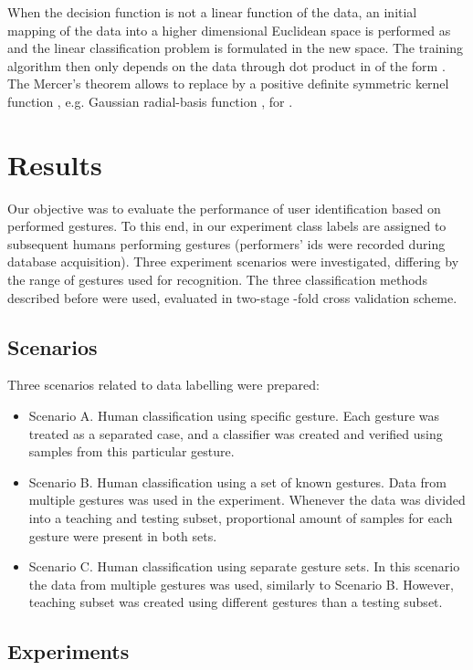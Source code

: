 \documentclass[]{article}
\begin{document}
When the decision function is not a linear function of the data, an initial
mapping  of the data into a higher dimensional Euclidean space  is
performed as  and the linear classification problem
is formulated in the new space. The training algorithm then only depends on the
data through dot product in  of the form .  The Mercer's theorem \cite{Burges:1998} allows to
replace  by a positive definite
symmetric kernel function , e.g. Gaussian
radial-basis function , for .

\section{Results}
Our objective was to evaluate the performance of user identification based on
performed gestures. To this end, in our experiment class labels are assigned to
subsequent humans performing gestures (performers' ids were recorded during
database acquisition). Three experiment scenarios were investigated, differing
by the range of gestures used for recognition. The three  classification methods
described before were used, evaluated in two-stage -fold cross validation
scheme.

\subsection{Scenarios}
Three scenarios related to data labelling were prepared:
\begin{itemize}
\item Scenario A. Human classification using specific gesture. Each gesture was
treated as a separated case, and a classifier was created and verified using
samples from this particular gesture.
\item Scenario B. Human classification using a set of known gestures. Data from
multiple gestures was used in the experiment. Whenever the data was divided into
a teaching and testing subset, proportional amount of samples for each gesture
were present in both sets.
\item Scenario C. Human classification using separate gesture sets. In this
scenario the data from multiple gestures was used, similarly to Scenario B.
However, teaching subset was created using different gestures than a testing
subset.
\end{itemize}

\subsection{Experiments}
\end{document}
